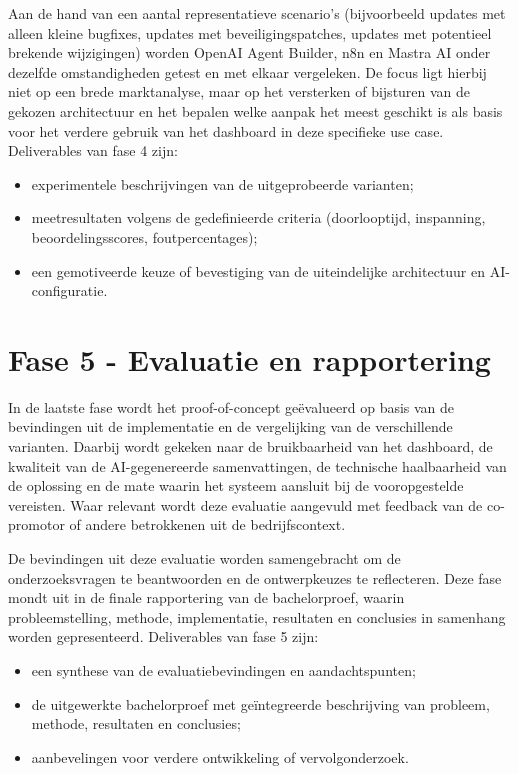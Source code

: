 Aan de hand van een aantal representatieve scenario’s (bijvoorbeeld updates met alleen kleine bugfixes, updates met beveiligingspatches, updates met potentieel brekende wijzigingen) worden OpenAI Agent Builder, n8n en Mastra AI onder dezelfde omstandigheden getest en met elkaar vergeleken. De focus ligt hierbij niet op een brede marktanalyse, maar op het versterken of bijsturen van de gekozen architectuur en het bepalen welke aanpak het meest geschikt is als basis voor het verdere gebruik van het dashboard in deze specifieke use case. Deliverables van fase 4 zijn:
\begin{itemize}
    \item experimentele beschrijvingen van de uitgeprobeerde varianten;
    \item meetresultaten volgens de gedefinieerde criteria (doorlooptijd, inspanning, beoordelingsscores, foutpercentages);
    \item een gemotiveerde keuze of bevestiging van de uiteindelijke architectuur en AI-configuratie.
\end{itemize}

\section{Fase 5 - Evaluatie en rapportering}
\label{sec:fase5}

In de laatste fase wordt het proof-of-concept geëvalueerd op basis van de bevindingen uit de implementatie en de vergelijking van de verschillende varianten. Daarbij wordt gekeken naar de bruikbaarheid van het dashboard, de kwaliteit van de AI-gegenereerde samenvattingen, de technische haalbaarheid van de oplossing en de mate waarin het systeem aansluit bij de vooropgestelde vereisten. Waar relevant wordt deze evaluatie aangevuld met feedback van de co-promotor of andere betrokkenen uit de bedrijfscontext.

De bevindingen uit deze evaluatie worden samengebracht om de onderzoeksvragen te beantwoorden en de ontwerpkeuzes te reflecteren. Deze fase mondt uit in de finale rapportering van de bachelorproef, waarin probleemstelling, methode, implementatie, resultaten en conclusies in samenhang worden gepresenteerd. Deliverables van fase 5 zijn:
\begin{itemize}
    \item een synthese van de evaluatiebevindingen en aandachtspunten;
    \item de uitgewerkte bachelorproef met geïntegreerde beschrijving van probleem, methode, resultaten en conclusies;
    \item aanbevelingen voor verdere ontwikkeling of vervolgonderzoek.
\end{itemize}

